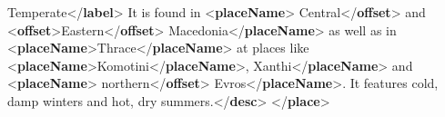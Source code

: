 \begin{shaded}
\hspace*{1em}\hspace*{1em}Temperate{</\textbf{label}>}\mbox{}\newline 
\hspace*{1em}\hspace*{1em}It is found in {<\textbf{placeName}>}\mbox{}\newline 
\hspace*{1em}\hspace*{1em}\hspace*{1em}\hspace*{1em}Central{</\textbf{offset}>} and {<\textbf{offset}>}Eastern{</\textbf{offset}>} Macedonia{</\textbf{placeName}>} as\mbox{}\newline 
\hspace*{1em}\hspace*{1em}\hspace*{1em}\hspace*{1em}\hspace*{1em}\hspace*{1em} well as in {<\textbf{placeName}>}Thrace{</\textbf{placeName}>} at places like {<\textbf{placeName}>}Komotini{</\textbf{placeName}>},\mbox{}\newline 
\hspace*{1em}\hspace*{1em}Xanthi{</\textbf{placeName}>} and {<\textbf{placeName}>}\mbox{}\newline 
\hspace*{1em}\hspace*{1em}\hspace*{1em}\hspace*{1em}northern{</\textbf{offset}>} Evros{</\textbf{placeName}>}. It features cold,\mbox{}\newline 
\hspace*{1em}\hspace*{1em}\hspace*{1em}\hspace*{1em}\hspace*{1em}\hspace*{1em} damp winters and hot, dry summers.{</\textbf{desc}>}\mbox{}\newline 
\hspace*{1em}\mbox{}\newline 
{}\mbox{}\newline 
{</\textbf{place}>}\end{shaded}\egroup\par \noindent  \par
